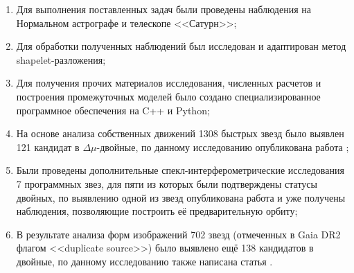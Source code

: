 \begin{enumerate}
 \item Для выполнения поставленных задач были проведены наблюдения на Нормальном астрографе и телескопе <<Сатурн>>;
 \item Для обработки полученных наблюдений был исследован и адаптирован метод shapelet-разложения;
   \item Для получения прочих материалов исследования, численных расчетов и построения промежуточных моделей было создано специализированное программное обеспечения на C++ и Python;
 \item На основе анализа собственных движений 1308 быстрых звезд было выявлен 121 кандидат в $\Delta\mu$-двойные, по данному исследованию опубликована работа \cite{2015AstL...41..833K};
 \item Были проведены дополнительные спекл-интерферометрические исследования 7 программных звез, для пяти из которых были подтверждены статусы двойных, по выявлению одной из звезд опубликована работа \cite{2016AstL...42..686K} и уже получены наблюдения, позволяющие построить её предварительную орбиту;
   \item В результате анализа форм изображений 702 звезд (отмеченных в Gaia DR2 флагом <<duplicate source>>) было выявлено ещё 138 кандидатов в двойные, по данному исследованию также написана статья \cite{2018AstL...44..103K}.
\end{enumerate}
